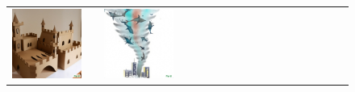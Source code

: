 \begin{figure}[ht!]
\begin{adjustwidth}{-0.8in}{-0.5in}
\begin{tabular}{cccccccccccccccccccc}
\multicolumn{2}{c}{\includegraphics[width=\threebythreecolwidth\textwidth]{figures/cherries/cardboard_castle_2.jpg}} &&
\multicolumn{2}{c}{\includegraphics[width=\threebythreecolwidth\textwidth]{figures/cherries/sharks_watercolor.jpg}} &

\end{tabular}
\end{adjustwidth}
\end{figure}
